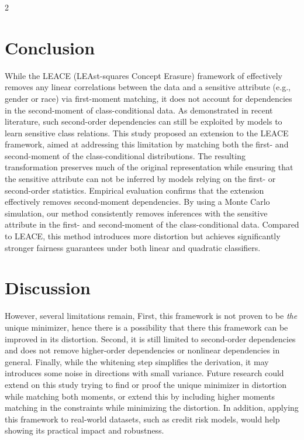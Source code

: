 \documentclass[ecta,nameyear,final]{econsocart}
\numberwithin{equation}{section}
\theoremstyle{plain}
\theoremstyle{definition}
\begin{document}
\begin{multicols}{2}
\section{Conclusion}
While the LEACE (LEAst-squares Concept Erasure) framework of \cite{Belrose2023} effectively removes any linear correlations between the data and a sensitive attribute (e.g., gender or race) via first-moment matching, it does not account for dependencies in the second-moment of class-conditional data. As demonstrated in recent literature, such second-order dependencies can still be exploited by models to learn sensitive class relations.
\newline \newline
This study proposed an extension to the LEACE framework, aimed at addressing this limitation by matching both the first- and second-moment of the class-conditional distributions.
\newline \newline
The resulting transformation preserves much of the original representation while ensuring that the sensitive attribute can not be inferred by models relying on the first- or second-order statistics.
\newline \newline
Empirical evaluation confirms that the extension effectively removes second-moment dependencies. By using a Monte Carlo simulation, our method consistently removes inferences with the sensitive attribute in the first- and second-moment of the class-conditional data.
\newline \newline
Compared to LEACE, this method introduces more distortion but achieves significantly stronger fairness guarantees under both linear and quadratic classifiers.

\section{Discussion}
However, several limitations remain, First, this framework is not proven to be \emph{the} unique minimizer, hence there is a possibility that there this framework can be improved in its distortion. Second, it is still limited to second-order dependencies and does not remove higher-order dependencies or nonlinear dependencies in general. Finally, while the whitening step simplifies the derivation, it may introduces some noise in directions with small variance.
\newline \newline
Future research could extend on this study trying to find or proof the unique minimizer in distortion while matching both moments, or extend this by including higher moments matching in the constraints while minimizing the distortion. In addition, applying this framework to real-world datasets, such as credit risk models, would help showing its practical impact and robustness.


\end{multicols}
\end{document}
